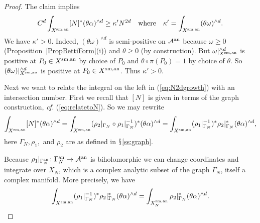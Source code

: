 \begin{proof}
The claim implies
\begin{equation}
\label{eq:N2dgrowth}
 C^d \int_{{X}^{\mathrm{sm,an}}}  [N]^*(\theta\alpha)^{\wedge d} \ge
\kappa' N^{2d} \quad\text{where}\quad \kappa' = \int_{{X}^{\mathrm{sm,an}}} (\theta\omega)^{\wedge d}.
\end{equation}
We have $\kappa' > 0$. Indeed, $(\theta\omega)^{\wedge d}$ is semi-positive on ${\mathcal{A}}^{\mathrm{an}}$ because $\omega \ge 0$ (Proposition~\ref{PropBettiForm}(i)) and $\theta \ge 0$ (by construction). But $\omega|_{{X}^{\mathrm{sm,an}}}^{\wedge d}$ is positive at $P_0 \in {X}^{\mathrm{sm,an}}$ by choice of $P_0$ and $\theta\circ \pi(P_0) = 1$ by choice of $\theta$. So $(\theta\omega)|_{{X}^{\mathrm{sm,an}}}^{\wedge d}$ is positive at $P_0 \in {X}^{\mathrm{sm,an}}$. Thus $\kappa' > 0$.

Next we want to relate the integral on the left in (\ref{eq:N2dgrowth}) with an
intersection number. First we recall that $[N]$ is given in terms of
the graph construction, \textit{cf.} (\ref{eq:relatetoN}). So we may
rewrite
\begin{equation}
\label{eq:chainbegins}
  \int_{{X}^{\mathrm{sm,an}}} [N]^*(\theta\alpha)^{\wedge d}  =
  \int_{{X}^{\mathrm{sm,an}}} (\rho_2|_{\Gamma_N} \circ
  \rho_1|_{\Gamma_N}^{-1})^*(\theta\alpha)^{\wedge d}=
  \int_{{X}^{\mathrm{sm,an}}} (\rho_1|_{\Gamma_N}^{-1})^*\rho_2|_{\Gamma_N}^*(\theta\alpha)^{\wedge d},
\end{equation}
here $\Gamma_N,\rho_1,$ and $\rho_2$ are as defined in $\mathsection$\ref{ss:graph}. 

Because $\rho_1|_{{\Gamma}^{\mathrm{an}}_N} \colon {\Gamma}^{\mathrm{an}}_N \rightarrow {\mathcal{A}}^{\mathrm{an}}$ is biholomorphic we
can change coordinates and integrate over $X_N$, which is a complex
analytic subset of the graph $\Gamma_N$, itself a complex manifold.
More precisely, we have
\begin{equation}
\label{eq:chain2} 
  \int_{{X}^{\mathrm{sm,an}}} (\rho_1|_{\Gamma_N}^{-1})^*\rho_2|_{\Gamma_N}^*(\theta\alpha)^{\wedge d}
=\int_{{X}^{\mathrm{sm,an}}_N}  \rho_2|_{\Gamma_N}^*(\theta\alpha)^{\wedge d}.
\end{equation} 



\end{proof}
